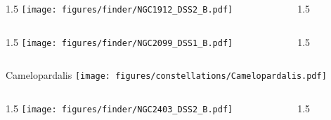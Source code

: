 \documentclass[final]{beamer}
\newlength{\colwidth}
\begin{document}
\begin{frame}[t]{}
  \begin{columns}[T]
    \begin{column}{1.5\colwidth}
      \centering
      \texttt{[image: figures/finder/NGC1912\_DSS2\_B.pdf]}
    \end{column}
    \begin{column}{1.5\colwidth}
      \Large
      
    \end{column}
  \end{columns}
  \vspace{\fill}
  \begin{columns}[T]
    \begin{column}{1.5\colwidth}
      \centering
      \texttt{[image: figures/finder/NGC2099\_DSS1\_B.pdf]}
    \end{column}
    \begin{column}{1.5\colwidth}
      \Large
      
    \end{column}
  \end{columns}
\end{frame}


\begin{frame}[t]{\LARGE Camelopardalis}
  \centering
  \texttt{[image: figures/constellations/Camelopardalis.pdf]}
\end{frame}


\begin{frame}[t]{}
  \begin{columns}[T]
    \begin{column}{1.5\colwidth}
      \centering
      \texttt{[image: figures/finder/NGC2403\_DSS2\_B.pdf]}
    \end{column}
    \begin{column}{1.5\colwidth}
      \Large
      
    \end{column}
  \end{columns}
  \vspace{\fill}
\end{frame}

\end{document}
